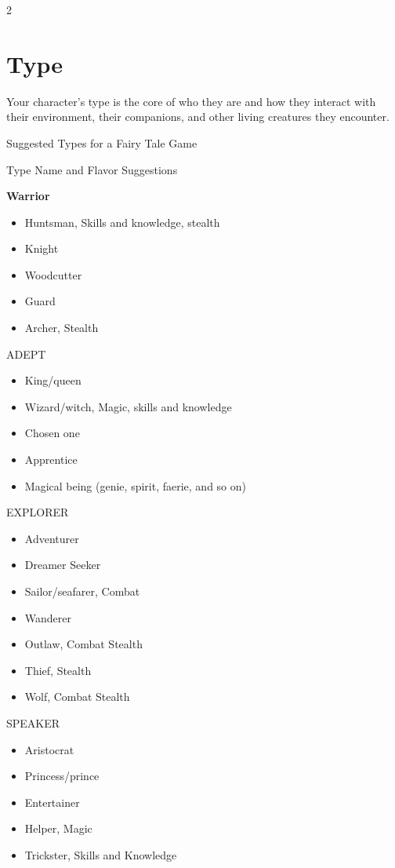 \begin{multicols}{2}
\section{Type}

Your character’s type is the core of who they are and how they interact with their environment, their companions, and other living creatures they encounter. 

Suggested Types for a Fairy Tale Game

Type Name and Flavor Suggestions

\textbf{Warrior}

\begin{itemize}
\item Huntsman, Skills and knowledge, stealth
\item Knight 
\item Woodcutter 
\item Guard 
\item Archer, Stealth
\end{itemize}

ADEPT
\begin{itemize}
\item King/queen
\item Wizard/witch, Magic, skills and knowledge
\item Chosen one
\item Apprentice
\item Magical being (genie, spirit, faerie, and so on)
\end{itemize}

EXPLORER
\begin{itemize}
\item Adventurer 
\item Dreamer Seeker 
\item Sailor/seafarer, Combat
\item Wanderer 
\item Outlaw, Combat Stealth
\item Thief, Stealth
\item Wolf, Combat Stealth
\end{itemize}

SPEAKER
\begin{itemize}
\item Aristocrat 
\item Princess/prince 
\item Entertainer 
\item Helper, Magic
\item Trickster, Skills and Knowledge
\end{itemize}


\end{multicols}

